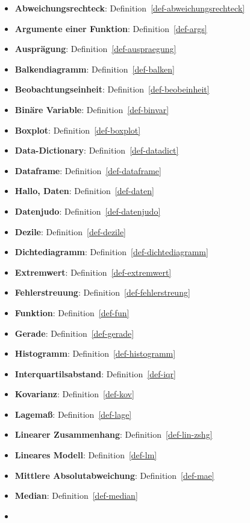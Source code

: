\documentclass[
  letterpaper,
]{scrbook}
\theoremstyle{definition}
\theoremstyle{definition}
\theoremstyle{definition}
\theoremstyle{remark}
\begin{document}
\begin{itemize}
\item
  \textbf{Abweichungsrechteck}: Definition~\ref{def-abweichungsrechteck}
\item
  \textbf{Argumente einer Funktion}: Definition~\ref{def-args}
\item
  \textbf{Ausprägung}: Definition~\ref{def-auspraegung}
\item
  \textbf{Balkendiagramm}: Definition~\ref{def-balken}
\item
  \textbf{Beobachtungseinheit}: Definition~\ref{def-beobeinheit}
\item
  \textbf{Binäre Variable}: Definition~\ref{def-binvar}
\item
  \textbf{Boxplot}: Definition~\ref{def-boxplot}
\item
  \textbf{Data-Dictionary}: Definition~\ref{def-datadict}
\item
  \textbf{Dataframe}: Definition~\ref{def-dataframe}
\item
  \textbf{Hallo, Daten}: Definition~\ref{def-daten}
\item
  \textbf{Datenjudo}: Definition~\ref{def-datenjudo}
\item
  \textbf{Dezile}: Definition~\ref{def-dezile}
\item
  \textbf{Dichtediagramm}: Definition~\ref{def-dichtediagramm}
\item
  \textbf{Extremwert}: Definition~\ref{def-extremwert}
\item
  \textbf{Fehlerstreuung}: Definition~\ref{def-fehlerstreung}
\item
  \textbf{Funktion}: Definition~\ref{def-fun}
\item
  \textbf{Gerade}: Definition~\ref{def-gerade}
\item
  \textbf{Histogramm}: Definition~\ref{def-histogramm}
\item
  \textbf{Interquartilsabstand}: Definition~\ref{def-iqr}
\item
  \textbf{Kovarianz}: Definition~\ref{def-kov}
\item
  \textbf{Lagemaß}: Definition~\ref{def-lage}
\item
  \textbf{Linearer Zusammenhang}: Definition~\ref{def-lin-zshg}
\item
  \textbf{Lineares Modell}: Definition~\ref{def-lm}
\item
  \textbf{Mittlere Absolutabweichung}: Definition~\ref{def-mae}
\item
  \textbf{Median}: Definition~\ref{def-median}
\item

\end{itemize}
\end{document}
